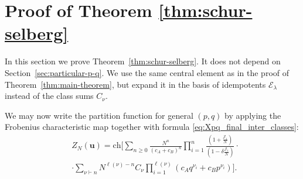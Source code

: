 \documentclass{article}
\theoremstyle{plain}
\theoremstyle{definition}
\numberwithin{equation}{section}
\begin{document}
\section{Proof of Theorem \ref{thm:schur-selberg}}
\label{sec:thm-SS-proof}

In this section we prove Theorem~\ref{thm:schur-selberg}. It does not depend
on Section~\ref{sec:particular-p-q}. We use the same central element as in the
proof of Theorem~\ref{thm:main-theorem}, but expand it in the basis of
idempotents $\mathcal{E}_\lambda$ instead of the class sums $C_\nu$.

We may now write the partition function for general $(p,q)$ by applying the Frobenius characteristic map together with formula \eqref{eq:Xpq_final_inter_classes}:
\begin{equation}
    \label{eq:part func result}
    \begin{aligned}
        & Z_N(\mathbf{u}) = \mathrm{ch} \Bigg[\sum_{n\ge0} \frac{N^{n}}{(c_A+c_B)^{n}} \prod_{i=1}^n \frac{\left(1+\frac{\mathcal{J}_i}{N}\right)}{\left(1- \delta \frac{\mathcal{J}_i}{N}\right)} \cdot \\
        & \cdot \sum_{\nu \vdash n}   N^{\ell(\nu)-n} C_\nu \prod_{i=1}^{\ell(\nu)} (c_A q^{\nu_i} + c_B p^{\nu_i})\Bigg].
    \end{aligned}
\end{equation}
\end{document}
